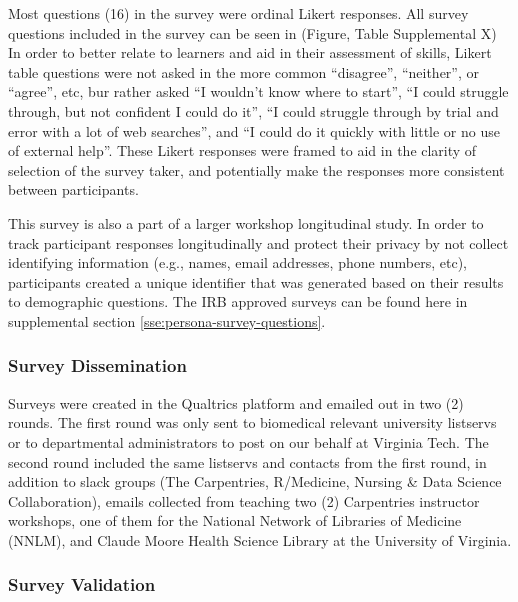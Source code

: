 \documentclass[020-persona\_validation.tex]{subfiles}
\begin{document}
            Most questions (16) in the survey were ordinal Likert responses.
            All survey questions included in the survey can be seen in
            (Figure, Table Supplemental X)
            In order to better relate to learners and aid in their assessment of skills,
            Likert table questions were not asked in the more common
            ``disagree'', ``neither'', or ``agree'', etc,
            bur rather asked
            ``I wouldn't know where to start'',
            ``I could struggle through, but not confident I could do it'',
            ``I could struggle through by trial and error with a lot of web searches'',
            and
            ``I could do it quickly with little or no use of external help''.
            These Likert responses were framed to aid in the clarity of selection of the survey taker,
            and potentially make the responses more consistent between participants.
    
            This survey is also a part of a larger workshop longitudinal study.
            In order to track participant responses longitudinally and protect their privacy by not collect identifying information
            (e.g., names, email addresses, phone numbers, etc),
            participants created a unique identifier that was generated based on their results to demographic questions.
            The IRB approved surveys can be found here in supplemental section \ref{sse:persona-survey-questions}.
        
        \subsubsection{Survey Dissemination}

            Surveys were created in the Qualtrics platform and emailed out in two (2) rounds.
            The first round was only sent to biomedical relevant university listservs
            or to departmental administrators to post on our behalf at Virginia Tech.
            The second round included the same listservs and contacts from the first round,
            in addition to slack groups (The Carpentries, R/Medicine, Nursing \& Data Science Collaboration),
            emails collected from teaching two (2) Carpentries instructor workshops,
            one of them for the National Network of Libraries of Medicine (NNLM),
            and
            Claude Moore Health Science Library at the University of Virginia.

        \subsubsection{Survey Validation}
    
\end{document}

